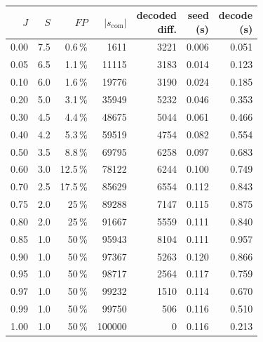 \begin{table}[t]
    \centering
    \caption{}
    \label{tab:rbf-phase-split}
    \begin{tabular}{rrrrrrr}
      \toprule
      $J$ & $S$ & $FP$ & $|s_{\mathrm{com}}|$ &
        \makecell{decoded\\diff.} & \makecell{seed\\(s)} & \makecell{decode\\(s)} \\
      \midrule
      0.00 & 7.5 & 0.6\,\% & 1611 & 3221 & 0.006 & 0.051 \\
      0.05 & 6.5 & 1.1\,\% & 11115 & 3183 & 0.014 & 0.123 \\
      0.10 & 6.0 & 1.6\,\% & 19776 & 3190 & 0.024 & 0.185 \\
      0.20 & 5.0 & 3.1\,\% & 35949 & 5232 & 0.046 & 0.353 \\
      0.30 & 4.5 & 4.4\,\% & 48675 & 5044 & 0.061 & 0.466 \\
      0.40 & 4.2 & 5.3\,\% & 59519 & 4754 & 0.082 & 0.554 \\
      0.50 & 3.5 & 8.8\,\% & 69795 & 6258 & 0.097 & 0.683 \\
      0.60 & 3.0 & 12.5\,\% & 78122 & 6244 & 0.100 & 0.749 \\
      0.70 & 2.5 & 17.5\,\% & 85629 & 6554 & 0.112 & 0.843 \\
      0.75 & 2.0 & 25\,\% & 89288 & 7147 & 0.115 & 0.875 \\
      0.80 & 2.0 & 25\,\% & 91667 & 5559 & 0.111 & 0.840 \\
      0.85 & 1.0 & 50\,\% & 95943 & 8104 & 0.111 & 0.957 \\
      0.90 & 1.0 & 50\,\% & 97367 & 5263 & 0.120 & 0.866 \\
      0.95 & 1.0 & 50\,\% & 98717 & 2564 & 0.117 & 0.759 \\
      0.97 & 1.0 & 50\,\% & 99232 & 1510 & 0.114 & 0.670 \\
      0.99 & 1.0 & 50\,\% & 99750 & 506 & 0.116 & 0.510 \\
      1.00 & 1.0 & 50\,\% & 100000 & 0 & 0.116 & 0.213 \\
      \bottomrule
    \end{tabular}
  \end{table}
